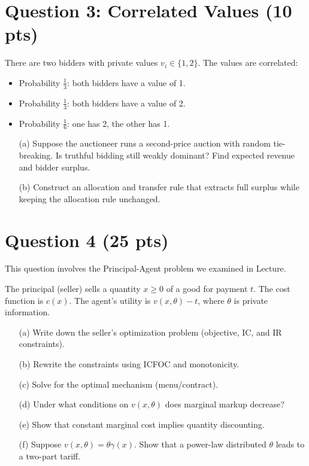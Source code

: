 \documentclass[10pt,a4paper]{article}
\begin{document}
\section*{Question 3: Correlated Values (10 pts)}
There are two bidders with private values $v_i \in \{1,2\}$. The values are correlated:
\begin{itemize}
    \item Probability $\frac{1}{3}$: both bidders have a value of 1.
    \item Probability $\frac{1}{3}$: both bidders have a value of 2.
    \item Probability $\frac{1}{6}$: one has 2, the other has 1.
\end{itemize}
\begin{enumerate}
    \item[(a)] Suppose the auctioneer runs a second-price auction with random tie-breaking. Is truthful bidding still weakly dominant? Find expected revenue and bidder surplus.
    \item[(b)] Construct an allocation and transfer rule that extracts full surplus while keeping the allocation rule unchanged.
\end{enumerate}

\section*{Question 4 (25 pts)}
This question involves the Principal-Agent problem we examined in Lecture.

The principal (seller) sells a quantity $x \geq 0$ of a good for payment $t$. The cost function is $c(x)$. The agent’s utility is $v(x, \theta) - t$, where $\theta$ is private information.
\begin{enumerate}
    \item[(a)] Write down the seller’s optimization problem (objective, IC, and IR constraints).
    \item[(b)] Rewrite the constraints using ICFOC and monotonicity.
    \item[(c)] Solve for the optimal mechanism (menu/contract).
    \item[(d)] Under what conditions on $v(x,\theta)$ does marginal markup decrease?
    \item[(e)] Show that constant marginal cost implies quantity discounting.
    \item[(f)] Suppose $v(x, \theta) = \theta \gamma(x)$. Show that a power-law distributed $\theta$ leads to a two-part tariff.
\end{enumerate}
\end{document}
